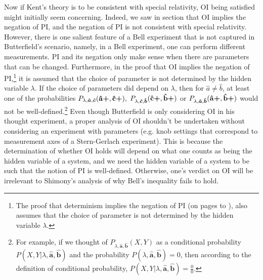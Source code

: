 Now if Kent's theory is to be consistent with special relativity, OI being satisfied might initially seem concerning. Indeed, we saw in section \pageref{OISec} that OI implies the negation of PI, and the negation of PI is not consistent with special relativity. However, there is one salient feature of a Bell experiment that is not captured in Butterfield's scenario, namely, in a Bell experiment, one can perform different measurements.  PI and its negation only make sense when there are parameters that can be changed. Furthermore, in the proof that OI implies the negation of PI,\footnote{The proof  that determinism implies the negation of PI (on pages \pageref{bellinequality2} to \pageref{PIdeterminism}), also assumes that the choice of parameter is not determined by the hidden variable $\lambda$.} it is assumed that the choice of parameter is not determined by the hidden variable $\lambda$. If the choice of parameters did depend on $\lambda$, then for $\hat{a}\neq\hat{b}$, at least one of the probabilities $P_{\lambda,\bm{\hat{a}},\bm{\hat{c}}}(\vb{\hat{{a}}}\bm{+},\vb{\hat{{c}}}\bm{+}),$ $P_{\lambda,\bm{\hat{c}},\bm{\hat{b}}}(\vb{\hat{{c}}}\bm{+},\vb{\hat{{b}}}\bm{+})$ or $P_{\lambda,\bm{\hat{a}},\bm{\hat{b}}}(\vb{\hat{{a}}}\bm{+},\vb{\hat{{b}}}\bm{+})$ would not be well-defined.\footnote{For example, if we thought of $P_{\lambda,\bm{\hat{a}},\bm{\hat{b}}}(X,Y)$ as a conditional probability $P(X,Y|\lambda,\bm{\hat{a}},\bm{\hat{b}})$ and the probability $P(\lambda,\bm{\hat{a}},\bm{\hat{b}})=0$, then according to the definition of conditional probability,  $P(X,Y|\lambda,\bm{\hat{a}},\bm{\hat{b}})=\frac{0}{0}.$} Even though Butterfield is only considering OI in his thought experiment, a proper analysis of OI shouldn't be undertaken without considering an experiment with parameters (e.g. knob settings that correspond to measurement axes of a Stern-Gerlach experiment). This is because the determination of whether OI holds will depend on what one counts as being the hidden variable of a system, and we need the hidden variable of a system to be such that the notion of PI is well-defined. Otherwise, one's verdict on OI will be irrelevant to Shimony's analysis of why Bell's inequality fails to hold. 


